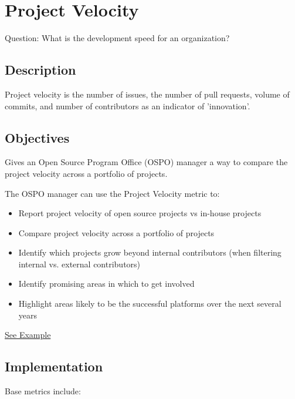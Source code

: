\hypertarget{project-velocity}{%
\section{Project Velocity}\label{project-velocity}}

Question: What is the development speed for an organization?

\hypertarget{description}{%
\subsection{Description}\label{description}}

Project velocity is the number of issues, the number of pull requests,
volume of commits, and number of contributors as an indicator of
'innovation'.

\hypertarget{objectives}{%
\subsection{Objectives}\label{objectives}}

Gives an Open Source Program Office (OSPO) manager a way to compare the
project velocity across a portfolio of projects.

The OSPO manager can use the Project Velocity metric to:

\begin{itemize}
\tightlist
\item
  Report project velocity of open source projects vs in-house projects
\item
  Compare project velocity across a portfolio of projects
\item
  Identify which projects grow beyond internal contributors (when
  filtering internal vs. external contributors)
\item
  Identify promising areas in which to get involved
\item
  Highlight areas likely to be the successful platforms over the next
  several years
\end{itemize}

\href{https://www.cncf.io/blog/2017/06/05/30-highest-velocity-open-source-projects}{See
Example}

\hypertarget{implementation}{%
\subsection{Implementation}\label{implementation}}

Base metrics include:

